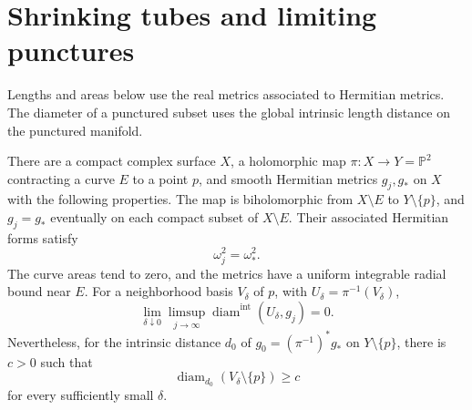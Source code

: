 \section{Shrinking tubes and limiting punctures}
\label{sec:hermitian-tube-puncture-separation}

Lengths and areas below use the real metrics associated to Hermitian metrics. The diameter of a punctured subset uses the global intrinsic length distance on the punctured manifold.

\begin{example}\label{ex:hermitian-tube-puncture-separation}
There are a compact complex surface $X$, a holomorphic map $\pi:X\to Y=\mathbb P^2$ contracting a curve $E$ to a point $p$, and smooth Hermitian metrics $g_j,g_*$ on $X$ with the following properties. The map is biholomorphic from $X\setminus E$ to $Y\setminus\{p\}$, and $g_j=g_*$ eventually on each compact subset of $X\setminus E$. Their associated Hermitian forms satisfy
\[
 \omega_j^2=\omega_*^2.
\]
The curve areas tend to zero, and the metrics have a uniform integrable radial bound near $E$. For a neighborhood basis $V_\delta$ of $p$, with $U_\delta=\pi^{-1}(V_\delta)$,
\[
 \lim_{\delta\downarrow0}\limsup_{j\to\infty}
       \operatorname{diam}^{\mathrm{int}}(U_\delta,g_j)=0.
\]
Nevertheless, for the intrinsic distance $d_0$ of $g_0=(\pi^{-1})^*g_*$ on $Y\setminus\{p\}$, there is $c>0$ such that
\[
 \operatorname{diam}_{d_0}(V_\delta\setminus\{p\})\geq c
\]
for every sufficiently small $\delta$.
\end{example}
